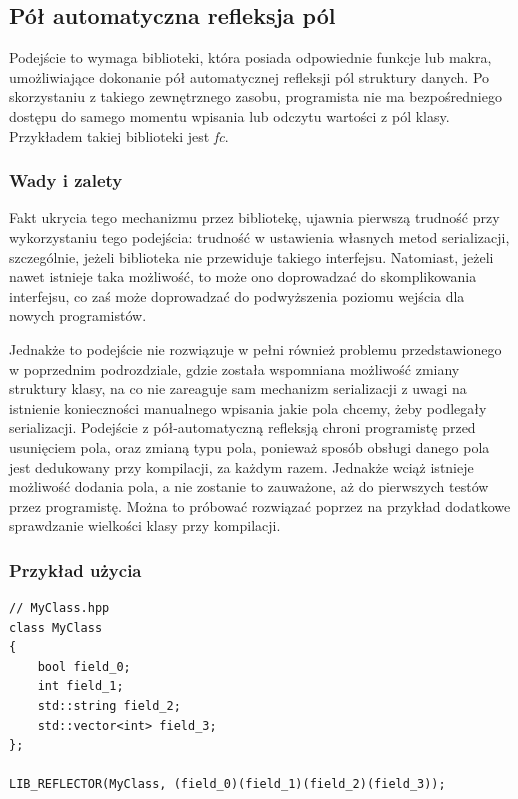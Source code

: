 \documentclass[12pt]{article}
\newcommand{\n}{\newline}
\begin{document}
{		{
			\subsection{Pół automatyczna refleksja pól}

			Podejście to wymaga biblioteki, która posiada odpowiednie funkcje lub makra, umożliwiające dokonanie pół automatycznej
			refleksji pól struktury danych. Po skorzystaniu z takiego zewnętrznego zasobu, programista nie ma bezpośredniego dostępu do samego momentu
			wpisania lub odczytu wartości z pól klasy. Przykładem takiej biblioteki jest {\it fc}\cite{fc_repo}.\n

			{
				\subsubsection{Wady i zalety}

				Fakt ukrycia tego mechanizmu przez bibliotekę, ujawnia pierwszą trudność przy wykorzystaniu tego podejścia: trudność w ustawienia własnych
				metod serializacji, szczególnie, jeżeli biblioteka nie przewiduje takiego interfejsu. Natomiast, jeżeli nawet istnieje taka możliwość,
				to może ono doprowadzać do skomplikowania interfejsu, co zaś może doprowadzać do podwyższenia poziomu wejścia dla nowych programistów.

				Jednakże to podejście nie rozwiązuje w pełni również problemu przedstawionego w poprzednim podrozdziale, gdzie została wspomniana
				możliwość zmiany struktury klasy, na co nie zareaguje sam mechanizm serializacji z uwagi na istnienie
				konieczności manualnego wpisania jakie pola chcemy, żeby podlegały serializacji. Podejście z pół-automatyczną refleksją
				chroni programistę przed usunięciem pola, oraz zmianą typu pola, ponieważ sposób obsługi danego pola jest dedukowany przy
				kompilacji, za każdym razem. Jednakże wciąż istnieje możliwość dodania pola, a nie zostanie to zauważone, aż do pierwszych testów
				przez programistę. Można to próbować rozwiązać poprzez na przykład dodatkowe sprawdzanie wielkości klasy przy kompilacji.
			}

			{
				\subsubsection{Przykład użycia}
				\begin{lstlisting}[frame=single]
// MyClass.hpp
class MyClass
{
	bool field_0;
	int field_1;
	std::string field_2;
	std::vector<int> field_3;
};

LIB_REFLECTOR(MyClass, (field_0)(field_1)(field_2)(field_3));


\end{lstlisting}}}}
\end{document}
